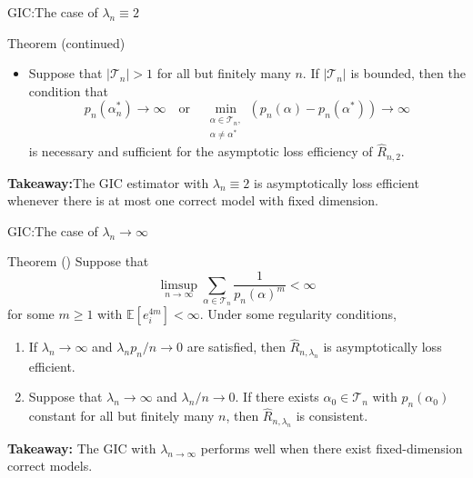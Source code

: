 \documentclass{beamer}
\newcommand{\0}{\emptyset}
\newcommand{\Ep}[1]{\mathbb{E}\left[ #1 \right]}
\newcommand{\paren}[1]{\left(#1 \right)}
\newcommand{\Tcal}{\mathcal{T}_{n}}
\newcommand{\1}{\mathmybb{1}}
\begin{document}
\begin{frame}{GIC:\@ The case of \(\lambda_{n} \equiv 2\)}
    \begin{block}{Theorem (continued)}
        \begin{itemize}
            \item Suppose that \(|\Tcal|>1\) for all but finitely many \(n\). 
            If \(|\Tcal|\) is bounded,
            then the condition that
            \begin{equation}
                \label{eq:conditionP}
                p_{n}(\alpha^{*}_{n})\to\infty\quad\text{or}\quad \min_{\substack{\alpha\in\Tcal,\\ \alpha\neq\alpha^{*}}}\paren{p_{n}(\alpha) - p_{n}(\alpha^{*})}\to\infty
            \end{equation}
            is necessary and sufficient for the asymptotic loss efficiency of \(\hat{R}_{n,2}\).
        \end{itemize}

    \end{block}
    \textbf{Takeaway:}\@ The GIC estimator with \(\lambda_{n} \equiv 2\) is asymptotically loss efficient whenever there is at most one correct model with fixed dimension.
\end{frame}


\begin{frame}{GIC:\@ The case of \(\lambda_{n} \to \infty\)}
    \begin{block}{Theorem (\cite{shao_1997})}\label{thm:97thm2}
        Suppose that
        \begin{equation}\label{eq:310}
            \limsup_{n\to\infty}\sum_{\alpha\in\Tcal}\frac{1}{p_{n}{(\alpha)}^{m}}<\infty
        \end{equation}
        for some \(m\geq1\) with \(\Ep{e_{i}^{4m}}<\infty\). Under some regularity conditions,
        \begin{enumerate}
            \item If \(\lambda_{n}\to\infty\) and \(\lambda_{n}p_{n}/n \to 0\) are satisfied, then \(\hat{R}_{n,\lambda_{n}}\) is asymptotically loss efficient.
            \item Suppose that \(\lambda_{n}\to\infty\) and \(\lambda_{n}/n\to 0\). If there exists \(\alpha_{0}\in\Tcal\) with \(p_{n}(\alpha_{0})\) constant for all but finitely many \(n\), then \(\hat{R}_{n,\lambda_{n}}\) is consistent. 
        \end{enumerate}
    \end{block}
    \textbf{Takeaway: }The GIC with \(\lambda_{n\to\infty}\) performs well when there exist fixed-dimension correct models.
\end{frame}
\end{document}
